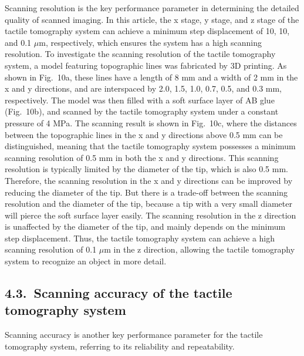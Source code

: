 \documentclass[11pt]{article}
\begin{document}
Scanning resolution is the key performance parameter in determining
the detailed quality of scanned imaging. In this article, the x
stage, y stage, and z stage of the tactile tomography system can
achieve a minimum step displacement of 10, 10, and 0.1 $\mu$m,
respectively, which ensures the system has a high scanning
resolution. To investigate the scanning resolution of the tactile
tomography system, a model featuring topographic lines was
fabricated by 3D printing. As shown in Fig.~10a, these lines have
a length of 8 mm and a width of 2 mm in the x and y directions,
and are interspaced by 2.0, 1.5, 1.0, 0.7, 0.5, and 0.3 mm,
respectively. The model was then filled with a soft surface layer
of AB glue (Fig.~10b), and scanned by the tactile tomography system
under a constant pressure of 4 MPa. The scanning result is shown
in Fig.~10c, where the distances between the topographic lines in
the x and y directions above 0.5 mm can be distinguished, meaning
that the tactile tomography system possesses a minimum scanning
resolution of 0.5 mm in both the x and y directions. This scanning
resolution is typically limited by the diameter of the tip, which
is also 0.5 mm. Therefore, the scanning resolution in the x and y
directions can be improved by reducing the diameter of the tip.
But there is a trade-off between the scanning resolution and the
diameter of the tip, because a tip with a very small diameter will
pierce the soft surface layer easily. The scanning resolution in
the z direction is unaffected by the diameter of the tip, and
mainly depends on the minimum step displacement. Thus, the tactile
tomography system can achieve a high scanning resolution of 0.1
$\mu$m in the z direction, allowing the tactile tomography system
to recognize an object in more detail.

\subsection*{4.3.\ Scanning accuracy of the tactile tomography system}

Scanning accuracy is another key performance parameter for the
tactile tomography system, referring to its reliability and
repeatability.
\end{document}
